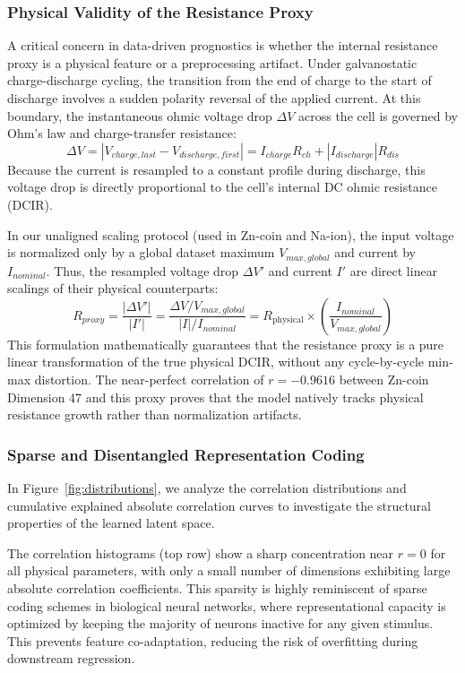 \documentclass[a4paper,fleqn]{cas-dc}
\begin{document}
\subsubsection{Physical Validity of the Resistance Proxy}
A critical concern in data-driven prognostics is whether the internal resistance proxy is a physical feature or a preprocessing artifact. Under galvanostatic charge-discharge cycling, the transition from the end of charge to the start of discharge involves a sudden polarity reversal of the applied current. At this boundary, the instantaneous ohmic voltage drop $\Delta V$ across the cell is governed by Ohm's law and charge-transfer resistance:
\begin{equation}
    \Delta V = |V_{charge,last} - V_{discharge,first}| = I_{charge} R_{ch} + |I_{discharge}| R_{dis}
\end{equation}
Because the current is resampled to a constant profile during discharge, this voltage drop is directly proportional to the cell's internal DC ohmic resistance (DCIR).

In our unaligned scaling protocol (used in Zn-coin and Na-ion), the input voltage is normalized only by a global dataset maximum $V_{max,global}$ and current by $I_{nominal}$. Thus, the resampled voltage drop $\Delta V'$ and current $I'$ are direct linear scalings of their physical counterparts:
\begin{equation}
    R_{proxy} = \frac{|\Delta V'|}{|I'|} = \frac{\Delta V / V_{max,global}}{|I| / I_{nominal}} = R_{\text{physical}} \times \left( \frac{I_{nominal}}{V_{max,global}} \right)
\end{equation}
This formulation mathematically guarantees that the resistance proxy is a pure linear transformation of the true physical DCIR, without any cycle-by-cycle min-max distortion. The near-perfect correlation of $r = -0.9616$ between Zn-coin Dimension 47 and this proxy proves that the model natively tracks physical resistance growth rather than normalization artifacts.

\subsubsection{Sparse and Disentangled Representation Coding}
In Figure~\ref{fig:distributions}, we analyze the correlation distributions and cumulative explained absolute correlation curves to investigate the structural properties of the learned latent space.

The correlation histograms (top row) show a sharp concentration near $r = 0$ for all physical parameters, with only a small number of dimensions exhibiting large absolute correlation coefficients. This sparsity is highly reminiscent of sparse coding schemes in biological neural networks, where representational capacity is optimized by keeping the majority of neurons inactive for any given stimulus. This prevents feature co-adaptation, reducing the risk of overfitting during downstream regression.
\end{document}
